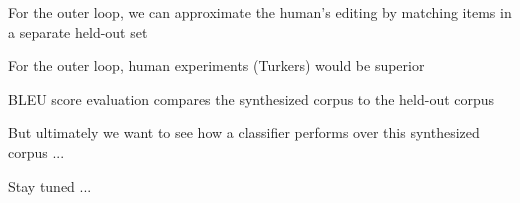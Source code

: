 \documentclass[12pt]{beamer}
\begin{document}
\begin{frame}{}
  For the outer loop, we can approximate the human's editing by matching items in a separate held-out set
\end{frame}

\begin{frame}{}
  For the outer loop, human experiments (Turkers) would be superior
\end{frame}

\begin{frame}{}
  BLEU score evaluation compares the synthesized corpus to the held-out corpus
\end{frame}

\begin{frame}{}
  But ultimately we want to see how a classifier performs over this synthesized
  corpus ...

  Stay tuned ...
\end{frame}
\end{document}
